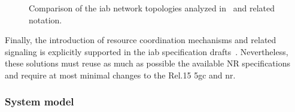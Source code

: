 \begin{figure}[tbp]
	\centering
  	\hfill
    \caption{Comparison of the \gls{iab} network topologies analyzed in~\cite{3gpp_38_874} and related notation.}
    \label{Fig:IAB_top_not}
\end{figure}

Finally, the introduction of resource coordination mechanisms and related signaling is explicitly supported in the \gls{iab} specification drafts~\cite{3gpp_38_874, 3gpp_38_174}. Nevertheless, these solutions must reuse as much as possible the available NR specifications and
require at most minimal changes to the Rel.15 \gls{5gc} and \gls{nr}.


\subsubsection{System model}
\label{Subsec:sys_model}


